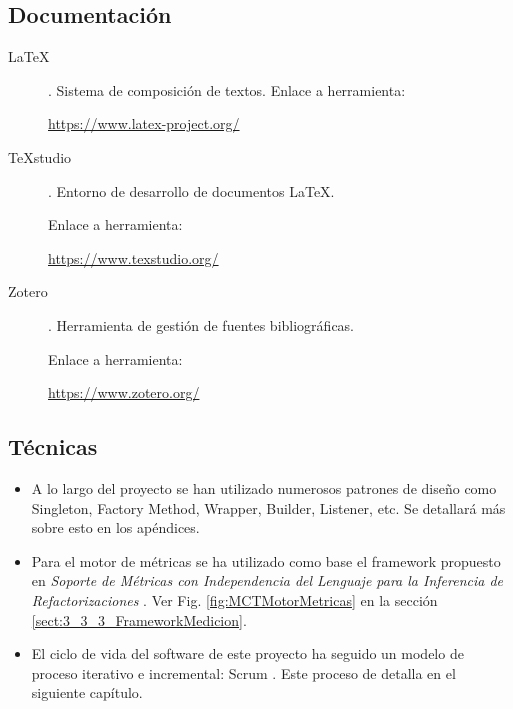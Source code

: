 \subsection{Documentación}
\begin{description}
	\item[LaTeX]. Sistema de composición de textos.
		Enlace a herramienta:
		
		\url{https://www.latex-project.org/}
		
	\item[TeXstudio]. Entorno de desarrollo de documentos LaTeX.
	
		Enlace a herramienta:
		
		\url{https://www.texstudio.org/}
	
	\item[Zotero]. Herramienta de gestión de fuentes bibliográficas.
		
		Enlace a herramienta:
		
		\url{https://www.zotero.org/}
	
\end{description}
\subsection{Técnicas}
\begin{itemize}
	\item A lo largo del proyecto se han utilizado numerosos patrones de diseño \citep{gamma_patrones_2002} como Singleton, Factory Method, Wrapper, Builder, Listener, etc. Se detallará más sobre esto en los apéndices.
	
	\item Para el motor de métricas se ha utilizado como base el framework propuesto en \textit{Soporte de Métricas con Independencia del Lenguaje para la Inferencia de Refactorizaciones} \citep{marticorena_soporte_2005}. Ver Fig. \ref{fig:MCTMotorMetricas} en la sección \ref{sect:3_3_3_FrameworkMedicion}.
	
	\item El ciclo de vida del software de este proyecto ha seguido un modelo de proceso iterativo e incremental: Scrum \citep{noauthor_scrum_2019}. Este proceso de detalla en el siguiente capítulo.
\end{itemize}

